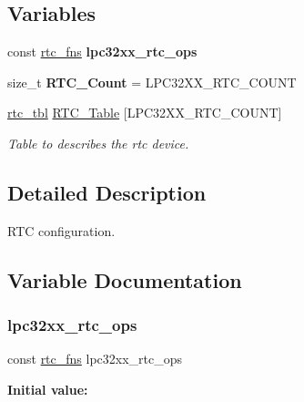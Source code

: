 \subsection*{Variables}
\begin{DoxyCompactItemize}
\item 
const \mbox{\hyperlink{struct__rtc__fns}{rtc\+\_\+fns}} {\bfseries lpc32xx\+\_\+rtc\+\_\+ops}
\item 
\mbox{\label{arm_2lpc32xx_2rtc_2rtc-config_8c_a7b04b3ddbc07be0bcfcd73fde9a9f399}} 
size\+\_\+t {\bfseries R\+T\+C\+\_\+\+Count} = L\+P\+C32\+X\+X\+\_\+\+R\+T\+C\+\_\+\+C\+O\+U\+NT
\item 
\mbox{\hyperlink{struct__rtc__tbl}{rtc\+\_\+tbl}} \mbox{\hyperlink{arm_2lpc32xx_2rtc_2rtc-config_8c_ac832362969a42fd1c1e0eb9022a4008d}{R\+T\+C\+\_\+\+Table}} \mbox{[}L\+P\+C32\+X\+X\+\_\+\+R\+T\+C\+\_\+\+C\+O\+U\+NT\mbox{]}
\begin{DoxyCompactList}\small\item\em Table to describes the rtc device. \end{DoxyCompactList}\end{DoxyCompactItemize}


\subsection{Detailed Description}
R\+TC configuration. 



\subsection{Variable Documentation}
\mbox{\label{arm_2lpc32xx_2rtc_2rtc-config_8c_a26a70197a6eadab09c615dc9a5dc22ef}} 
\subsubsection{\texorpdfstring{lpc32xx\_rtc\_ops}{lpc32xx\_rtc\_ops}}
{\footnotesize\ttfamily const \mbox{\hyperlink{struct__rtc__fns}{rtc\+\_\+fns}} lpc32xx\+\_\+rtc\+\_\+ops}

{\bfseries Initial value\+:}
\begin{DoxyCode}{0}
\DoxyCodeLine{= \{}
\DoxyCodeLine{\}}

\end{DoxyCode}
\mbox{\label{arm_2lpc32xx_2rtc_2rtc-config_8c_ac832362969a42fd1c1e0eb9022a4008d}} 
